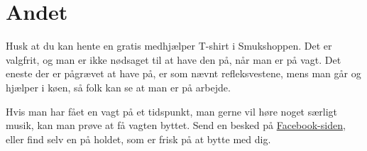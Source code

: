 \section{Andet}
\label{sec:andet}

Husk at du kan hente en gratis medhjælper T-shirt i Smukshoppen. Det er valgfrit, og man 
er ikke nødsaget til at have den på, når man er på vagt. Det eneste der er pågrævet at 
have på, er som nævnt refleksvestene, mens man går og hjælper i køen, så folk kan se at 
man er på arbejde.

Hvis man har fået en vagt på et tidspunkt, man gerne vil høre noget særligt musik, kan man prøve
at få vagten byttet. Send en besked på 
\href{https://www.facebook.com/groups/522504429506820}{Facebook-siden}, eller find selv en på holdet, 
som er frisk på at bytte med dig.